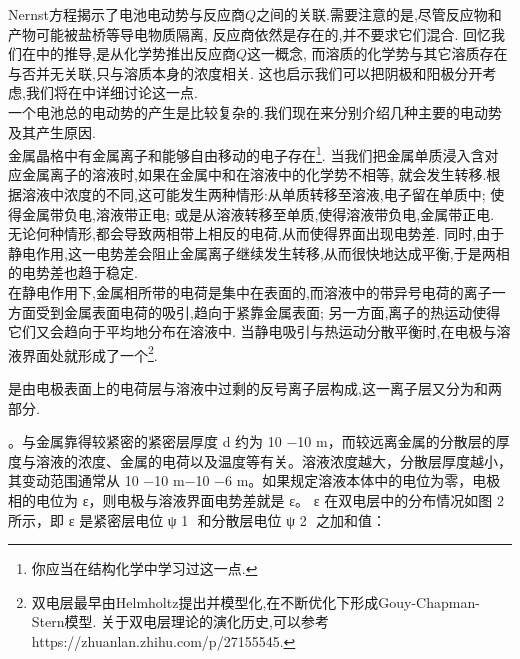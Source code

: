 \documentclass{ctexart}
\begin{document}
Nernst方程揭示了电池电动势与反应商$Q$之间的关联.需要注意的是,尽管反应物和产物可能被盐桥等导电物质隔离,%
反应商依然是存在的,并不要求它们混合.%
回忆我们在中的推导,是从化学势推出反应商$Q$这一概念,%
而溶质的化学势与其它溶质存在与否并无关联,只与溶质本身的浓度相关.%
这也启示我们可以把阴极和阳极分开考虑,我们将在中详细讨论这一点.\vspace{12pt}\\
\indent 一个电池总的电动势的产生是比较复杂的.我们现在来分别介绍几种主要的电动势及其产生原因.\vspace{4pt}\\
\indent 金属晶格中有金属离子和能够自由移动的电子存在\footnote{你应当在结构化学中学习过这一点.}.%
当我们把金属单质浸入含对应金属离子的溶液时,如果在金属中和在溶液中的化学势不相等,%
就会发生转移.根据溶液中浓度的不同,这可能发生两种情形:从单质转移至溶液,电子留在单质中;%
使得金属带负电,溶液带正电;%
或是从溶液转移至单质,使得溶液带负电,金属带正电.\\
\indent 无论何种情形,都会导致两相带上相反的电荷,从而使得界面出现电势差.%
同时,由于静电作用,这一电势差会阻止金属离子继续发生转移,从而很快地达成平衡,于是两相的电势差也趋于稳定.\\
\indent 在静电作用下,金属相所带的电荷是集中在表面的,而溶液中的带异号电荷的离子一方面受到金属表面电荷的吸引,趋向于紧靠金属表面;%
另一方面,离子的热运动使得它们又会趋向于平均地分布在溶液中.%
当静电吸引与热运动分散平衡时,在电极与溶液界面处就形成了一个\footnote{双电层最早由Helmholtz提出并模型化,在不断优化下形成Gouy-Chapman-Stern模型.%
关于双电层理论的演化历史,可以参考https://zhuanlan.zhihu.com/p/27155545.}.
\begin{definition}[6B.3.1 双电层]
    是由电极表面上的电荷层与溶液中过剩的反号离子层构成,这一离子层又分为和两部分.\\
    
\end{definition}
\indent 。与金属靠得较紧密的紧密层厚度 d 约为 10 
−10
 m，而较远离金属的分散层的厚度与溶液的浓度、金属的电荷以及温度等有关。溶液浓度越大，分散层厚度越小，其变动范围通常从 10 
−10
 m−10 
−6
 m。如果规定溶液本体中的电位为零，电极相的电位为 ε，则电极与溶液界面电势差就是 ε。 ε 在双电层中的分布情况如图 2 所示，即 ε 是紧密层电位 ψ 
1
​
  和分散层电位 ψ 
2
​
  之加和值：
\end{document}

